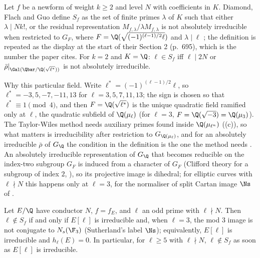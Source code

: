 \begin{definition}\label{def:congruence:exceptional-set}
Let $f$ be a newform of weight $k\ge2$ and level $N$ with coefficients in $K$. Diamond, Flach and Guo define $S_f$ as the set of finite primes $\lambda$ of $K$ such that either $\lambda\mid Nk!$, or the
residual representation $M_{f,\lambda}/\lambda M_{f,\lambda}$ is not absolutely irreducible when restricted to $G_F$, where $F=\Q(\sqrt{(-1)^{(\ell-1)/2}\ell})$ and $\lambda\mid\ell$ \cite[Section 0.2]{DFG04}; the
definition is repeated as the display \cite[(31)]{DFG04} at the start of their Section 2 (p.~695), which is the number the paper cites. For $k=2$ and $K=\Q$: $\ell\in S_f$ iff $\ell\mid2N$ or $\bar\rho|_{\Gal(\Qbar/\Q(\sqrt{\ell^*}))}$ is not absolutely irreducible.
\end{definition}

Why this particular field. Write $\ell^*=(-1)^{(\ell-1)/2}\ell$, so $\ell^*=-3,5,-7,-11,13$ for $\ell=3,5,7,11,13$; the sign is chosen so that $\ell^*\equiv1\pmod4$, and then $F=\Q(\sqrt{\ell^*})$ is the unique
quadratic field ramified only at $\ell$, the quadratic subfield of $\Q(\mu_\ell)$ (for $\ell=3$, $F=\Q(\sqrt{-3})=\Q(\mu_3)$). The Taylor-Wiles method needs auxiliary primes found inside
$\Q(\mu_{\ell^n})$ ((c)), so what matters is irreducibility after restriction to $G_{\Q(\mu_\ell)}$, and for an absolutely irreducible $\bar\rho$ of $G_\Q$ the
condition in the definition is the one the method needs \cite[Section 3.1]{DFG04}. An absolutely irreducible representation of $G_\Q$ that becomes reducible on the index-two subgroup $G_F$ is induced
from a character of $G_F$ (Clifford theory for a subgroup of index $2$, ), so its projective image is dihedral; for elliptic curves with $\ell\nmid N$ this happens only at $\ell=3$, for the normaliser of split Cartan
image $\Ns$ of .

\begin{proposition}\label{prop:congruence:exceptional-set}
Let $E/\Q$ have conductor $N$, $f=f_E$, and $\ell$ an odd prime with $\ell\nmid N$. Then $\ell\notin S_f$ if and only if $E[\ell]$ is irreducible and, when $\ell=3$, the mod $3$ image is not conjugate to
$N_s(\F_3)$ (Sutherland's label $\Ns$); equivalently, $E[\ell]$ is irreducible and $h_\ell(E)=0$. In particular, for $\ell\ge5$ with $\ell\nmid N$, $\ell\notin S_f$ as soon as $E[\ell]$ is irreducible.
\end{proposition}

